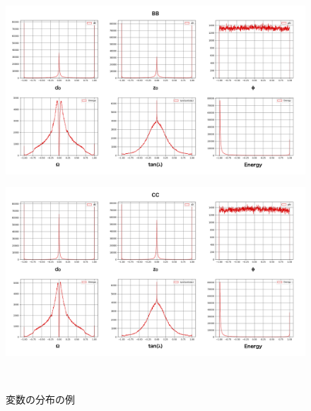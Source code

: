 \begin{figure}[htbp]
  \begin{minipage}{1.0\textwidth}
  \centering
   \begin{minipage}{0.48\textwidth}
   \centering
    \includegraphics[width=1.0\textwidth, clip]{Figure/3Networks/3-1-2-2ReshapedVariablesBB.png}
    \label{3-1-2-2ReshapedVariablesBB}
   \end{minipage}
   \begin{minipage}{0.48\textwidth}
   \centering
    \includegraphics[width=1.0\textwidth, clip]{Figure/3Networks/3-1-2-2ReshapedVariablesCC.png}
    \label{3-1-2-2ReshapedVariablesCC}
   \end{minipage}
   \end{minipage}
  \caption{変数の分布の例}
  \label{3-1-2-2Variables}
\end{figure}

